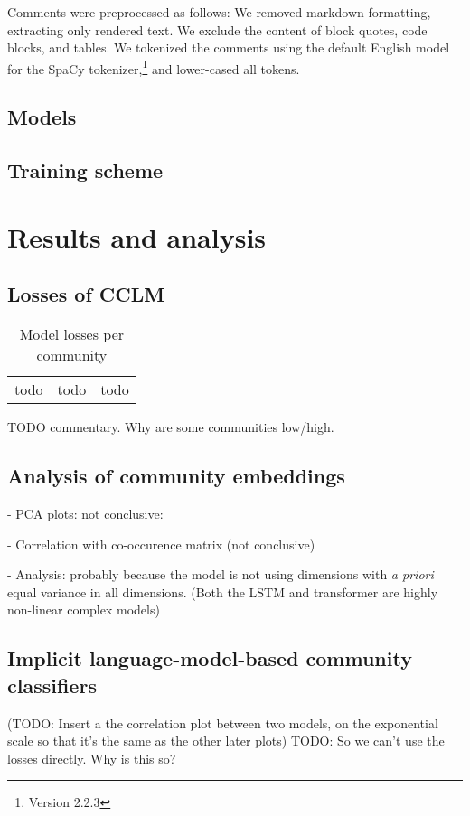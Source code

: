 \documentclass[11pt,a4paper]{article}
\begin{document}
Comments were preprocessed as follows: 
We removed markdown formatting, extracting only rendered text. 
We exclude the content of block quotes, code blocks, and tables. 
We tokenized the comments using the default English model for the SpaCy tokenizer,\footnote{Version 2.2.3}
and lower-cased all tokens. 


\subsection{Models}
\subsection{Training scheme}

\section{Results and analysis}

\subsection{Losses of CCLM}

\begin{table}
  \centering
  \begin{tabular}{ccc}
    todo &todo &todo 
  \end{tabular}
  \caption{Model losses per community}
  \label{tab:losses}
\end{table}
TODO commentary. Why are some communities low/high.

\subsection{Analysis of community embeddings}

- PCA plots: not conclusive:

- Correlation with co-occurence matrix (not conclusive)

- Analysis: probably because the model is not using dimensions
with \emph{a priori} equal variance in all dimensions. (Both the LSTM and transformer are highly non-linear complex models)

\subsection{Implicit language-model-based community classifiers}

(TODO: Insert a the correlation plot between two models, on the exponential scale so that it's the same as the other later plots)
TODO: So we can't use the losses directly. Why is this so?
\end{document}

